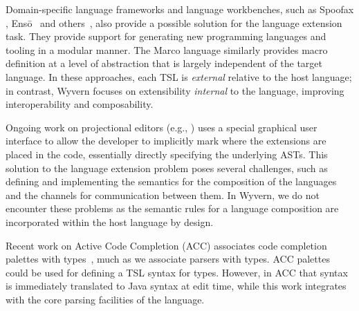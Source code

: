 Domain-specific language frameworks and language workbenches, such as Spoofax \cite{KatsVisser2010}, Ens\={o}~\cite{enso} and others~\cite{krahn2008monticore,van1992pregmatic}, also provide a possible solution for the language extension task. They provide support for generating new programming languages and tooling in a modular manner.  The Marco language \cite{lee:2012:marco} similarly provides macro definition at a level of abstraction that is largely independent of the target language. In these approaches, each TSL is \emph{external} relative to the host language; in contrast, Wyvern focuses on extensibility \emph{internal} to the language, improving interoperability and composability.

Ongoing work on projectional editors (e.g., \cite{mps,Diekmann:2013}) uses a special graphical user interface to allow the developer to implicitly mark where the extensions are placed in the code, essentially directly specifying the underlying ASTs. This solution to the language extension problem poses several challenges, such as defining and implementing the semantics for the composition of the languages and the channels for communication between them. In Wyvern, we do not encounter these problems as the semantic rules for a language composition are incorporated within the host language by design.

Recent work on Active Code Completion (ACC) associates code completion palettes with types~\cite{omar2012active}, much as we associate parsers with types. ACC palettes could be used for defining a TSL syntax for types. However, in ACC that syntax
is immediately translated to Java syntax at edit time, while this work
integrates with the core parsing facilities of the language.
